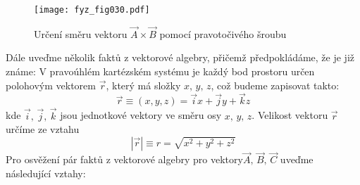 {    \begin{figure}[ht!]  %
      \centering
      \texttt{[image: fyz\_fig030.pdf]}
      \caption{Určení směru vektoru $\vec{A}\times\vec{B}$ pomocí pravotočivého šroubu}
      \label{fyz:fig030} 
    \end{figure}
    Dále uveďme několik faktů z vektorové algebry, přičemž předpokládáme, že je již známe: V 
    pravoúhlém kartézském systému je každý bod prostoru určen polohovým vektorem $\vec{r}$, který 
    má složky $x,\,y,\,z$, což budeme zapisovat takto:
    \begin{equation}\label{fyz:eq242}
      \vec{r}\equiv(x,y,z)=\vec{i}x+\vec{j}y+\vec{k}z
    \end{equation}
    kde $\vec{i},\,\vec{j},\,\vec{k}$ jsou jednotkové vektory ve směru osy $x,\,y,\,z$. Velikost 
    vektoru $\vec{r}$ určíme ze vztahu
    \begin{equation}\label{fyz:eq243}
      |\vec{r}|\equiv r = \sqrt{x^2+y^2+z^2}
    \end{equation}
    Pro osvěžení pár faktů z vektorové algebry pro vektory$\vec{A},\,\vec{B},\,\vec{C}$ uveďme 
    následující vztahy: 

}
